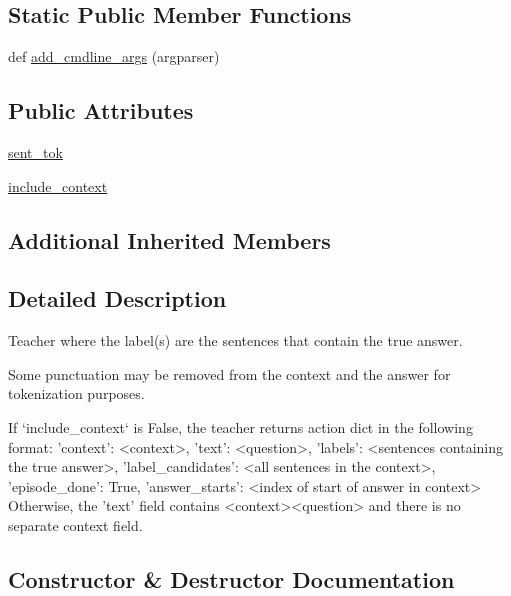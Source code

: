 \subsection*{Static Public Member Functions}
\begin{DoxyCompactItemize}
\item 
def \hyperlink{classparlai_1_1tasks_1_1squad_1_1agents_1_1SentenceTeacher_a7cbe635ae17b8deee040f3f23e9163fa}{add\+\_\+cmdline\+\_\+args} (argparser)
\end{DoxyCompactItemize}
\subsection*{Public Attributes}
\begin{DoxyCompactItemize}
\item 
\hyperlink{classparlai_1_1tasks_1_1squad_1_1agents_1_1SentenceTeacher_a35acf467970e62528b74dd9a3dcc45a9}{sent\+\_\+tok}
\item 
\hyperlink{classparlai_1_1tasks_1_1squad_1_1agents_1_1SentenceTeacher_a499aa8bdcd4d4af34d87a79fe7186854}{include\+\_\+context}
\end{DoxyCompactItemize}
\subsection*{Additional Inherited Members}


\subsection{Detailed Description}
\begin{DoxyVerb}Teacher where the label(s) are the sentences that contain the true answer.

Some punctuation may be removed from the context and the answer for
tokenization purposes.

If `include_context` is False, the teacher returns action dict in the
following format:
{
    'context': <context>,
    'text': <question>,
    'labels': <sentences containing the true answer>,
    'label_candidates': <all sentences in the context>,
    'episode_done': True,
    'answer_starts': <index of start of answer in context>
}
Otherwise, the 'text' field contains <context>\n<question> and there is
no separate context field.
\end{DoxyVerb}
 

\subsection{Constructor \& Destructor Documentation}
\mbox{\label{classparlai_1_1tasks_1_1squad_1_1agents_1_1SentenceTeacher_ae193e2962a772dc370f05077330c05c6}} 
